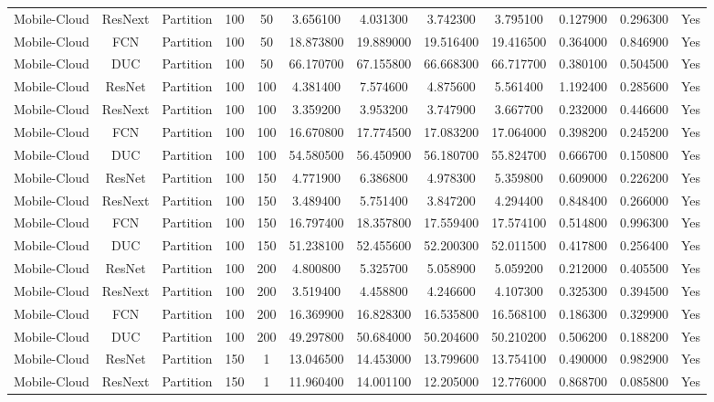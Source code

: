 \begin{tabular}{|c||c||c||c||c||c||c||c||c||c||c||c|}
Mobile-Cloud & ResNext & Partition & 100 & 50 & 3.656100 & 4.031300 & 3.742300 & 3.795100 & 0.127900 & 0.296300 & Yes \\
Mobile-Cloud & FCN & Partition & 100 & 50 & 18.873800 & 19.889000 & 19.516400 & 19.416500 & 0.364000 & 0.846900 & Yes \\
Mobile-Cloud & DUC & Partition & 100 & 50 & 66.170700 & 67.155800 & 66.668300 & 66.717700 & 0.380100 & 0.504500 & Yes \\
Mobile-Cloud & ResNet & Partition & 100 & 100 & 4.381400 & 7.574600 & 4.875600 & 5.561400 & 1.192400 & 0.285600 & Yes \\
Mobile-Cloud & ResNext & Partition & 100 & 100 & 3.359200 & 3.953200 & 3.747900 & 3.667700 & 0.232000 & 0.446600 & Yes \\
Mobile-Cloud & FCN & Partition & 100 & 100 & 16.670800 & 17.774500 & 17.083200 & 17.064000 & 0.398200 & 0.245200 & Yes \\
Mobile-Cloud & DUC & Partition & 100 & 100 & 54.580500 & 56.450900 & 56.180700 & 55.824700 & 0.666700 & 0.150800 & Yes \\
Mobile-Cloud & ResNet & Partition & 100 & 150 & 4.771900 & 6.386800 & 4.978300 & 5.359800 & 0.609000 & 0.226200 & Yes \\
Mobile-Cloud & ResNext & Partition & 100 & 150 & 3.489400 & 5.751400 & 3.847200 & 4.294400 & 0.848400 & 0.266000 & Yes \\
Mobile-Cloud & FCN & Partition & 100 & 150 & 16.797400 & 18.357800 & 17.559400 & 17.574100 & 0.514800 & 0.996300 & Yes \\
Mobile-Cloud & DUC & Partition & 100 & 150 & 51.238100 & 52.455600 & 52.200300 & 52.011500 & 0.417800 & 0.256400 & Yes \\
Mobile-Cloud & ResNet & Partition & 100 & 200 & 4.800800 & 5.325700 & 5.058900 & 5.059200 & 0.212000 & 0.405500 & Yes \\
Mobile-Cloud & ResNext & Partition & 100 & 200 & 3.519400 & 4.458800 & 4.246600 & 4.107300 & 0.325300 & 0.394500 & Yes \\
Mobile-Cloud & FCN & Partition & 100 & 200 & 16.369900 & 16.828300 & 16.535800 & 16.568100 & 0.186300 & 0.329900 & Yes \\
Mobile-Cloud & DUC & Partition & 100 & 200 & 49.297800 & 50.684000 & 50.204600 & 50.210200 & 0.506200 & 0.188200 & Yes \\
Mobile-Cloud & ResNet & Partition & 150 & 1 & 13.046500 & 14.453000 & 13.799600 & 13.754100 & 0.490000 & 0.982900 & Yes \\
Mobile-Cloud & ResNext & Partition & 150 & 1 & 11.960400 & 14.001100 & 12.205000 & 12.776000 & 0.868700 & 0.085800 & Yes \\

\end{tabular}

